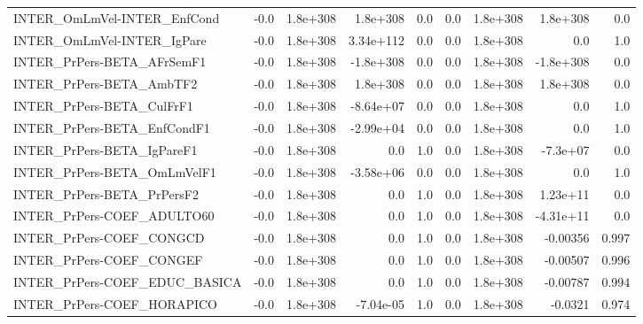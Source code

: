 \begin{tabular}{lrrrrrrrr}
INTER\_OmLmVel-INTER\_EnfCond           &        -0.0 &     1.8e+308 &   1.8e+308 &      0.0 &        0.0 &    1.8e+308 &     1.8e+308 &           0.0 \\
INTER\_OmLmVel-INTER\_IgPare            &        -0.0 &     1.8e+308 &  3.34e+112 &      0.0 &        0.0 &    1.8e+308 &          0.0 &           1.0 \\
INTER\_PrPers-BETA\_AFrSemF1            &        -0.0 &     1.8e+308 &  -1.8e+308 &      0.0 &        0.0 &    1.8e+308 &    -1.8e+308 &           0.0 \\
INTER\_PrPers-BETA\_AmbTF2              &        -0.0 &     1.8e+308 &   1.8e+308 &      0.0 &        0.0 &    1.8e+308 &     1.8e+308 &           0.0 \\
INTER\_PrPers-BETA\_CulFrF1             &        -0.0 &     1.8e+308 &  -8.64e+07 &      0.0 &        0.0 &    1.8e+308 &          0.0 &           1.0 \\
INTER\_PrPers-BETA\_EnfCondF1           &        -0.0 &     1.8e+308 &  -2.99e+04 &      0.0 &        0.0 &    1.8e+308 &          0.0 &           1.0 \\
INTER\_PrPers-BETA\_IgPareF1            &        -0.0 &     1.8e+308 &        0.0 &      1.0 &        0.0 &    1.8e+308 &     -7.3e+07 &           0.0 \\
INTER\_PrPers-BETA\_OmLmVelF1           &        -0.0 &     1.8e+308 &  -3.58e+06 &      0.0 &        0.0 &    1.8e+308 &          0.0 &           1.0 \\
INTER\_PrPers-BETA\_PrPersF2            &        -0.0 &     1.8e+308 &        0.0 &      1.0 &        0.0 &    1.8e+308 &     1.23e+11 &           0.0 \\
INTER\_PrPers-COEF\_ADULTO60            &        -0.0 &     1.8e+308 &        0.0 &      1.0 &        0.0 &    1.8e+308 &    -4.31e+11 &           0.0 \\
INTER\_PrPers-COEF\_CONGCD              &        -0.0 &     1.8e+308 &        0.0 &      1.0 &        0.0 &    1.8e+308 &     -0.00356 &         0.997 \\
INTER\_PrPers-COEF\_CONGEF              &        -0.0 &     1.8e+308 &        0.0 &      1.0 &        0.0 &    1.8e+308 &     -0.00507 &         0.996 \\
INTER\_PrPers-COEF\_EDUC\_BASICA         &        -0.0 &     1.8e+308 &        0.0 &      1.0 &        0.0 &    1.8e+308 &     -0.00787 &         0.994 \\
INTER\_PrPers-COEF\_HORAPICO            &        -0.0 &     1.8e+308 &  -7.04e-05 &      1.0 &        0.0 &    1.8e+308 &      -0.0321 &         0.974 \\

\end{tabular}
